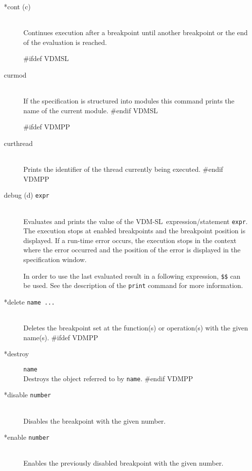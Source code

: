 \documentclass[\pformat,12pt]{article}
\newcommand{\vdmslpp}{VDM-SL}
\newcommand{\vdmslpp}{VDM++}
\begin{document}
\begin{description}
\item[*cont (c)] \mbox{}\\
  Continues execution after a breakpoint until another breakpoint or
  the end of the evaluation is reached.

#ifdef VDMSL
\item[curmod] \mbox{}\\
  If the specification is structured into modules this command
  prints the name of the current module.
#endif VDMSL

#ifdef VDMPP
\item[curthread]\mbox{}\\
  Prints the identifier of the thread currently being executed.
#endif VDMPP

\item[debug (d) {\tt expr}]  \mbox{}\\
  Evaluates and prints the value of the \vdmslpp\ expression/statement
  {\tt expr}.  The execution stops at enabled breakpoints
   and the breakpoint position is displayed. If a
  run-time error occurs, the execution stops in the context
  where the error occurred and the position of the error is
  displayed in the specification window.
  
  In order to use the last evaluated result in a following
  expression, {\tt \$\$}\index{\$\$} can be used. See the description
  of the {\tt print} command for more information.
    
\item[*delete {\tt name ...}] \mbox{}\\
  Deletes the breakpoint set at the function(s) or
  operation(s) with the given
  name(s). 
#ifdef VDMPP
\item[*destroy] {\tt name}\mbox{}\\
  Destroys the object referred to by {\tt name}.
#endif VDMPP

\item[*disable \texttt{number}]
\mbox{}\\
  Disables the breakpoint with the given number.

\item[*enable \texttt{number}]
\mbox{}\\
  Enables the previously disabled breakpoint with the given number.


\end{description}
\end{document}
